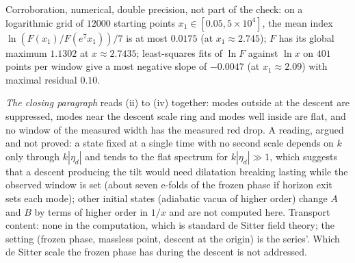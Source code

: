 Corroboration, numerical, double precision, not part of the check: on a logarithmic grid of $12000$ starting points $x_1 \in [0.05, 5 \times 10^{4}]$, the mean index $\ln(F(x_1)/F(e^{7}x_1))/7$ is at most $0.0175$ (at $x_1 \approx 2.745$); $F$ has its global maximum $1.1302$ at $x \approx 2.7435$; least-squares fits of $\ln F$ against $\ln x$ on $401$ points per window give a most negative slope of $-0.0047$ (at $x_1 \approx 2.09$) with maximal residual $0.10$. 

\emph{The closing paragraph} reads (ii) to (iv) together: modes outside at the descent are suppressed, modes near the descent scale ring and modes well inside are flat, and no window of the measured width has the measured red drop. A reading, argued and not proved: a state fixed at a single time with no second scale depends on $k$ only through $k|\eta_d|$ and tends to the flat spectrum for $k|\eta_d| \gg 1$, which suggests that a descent producing the tilt would need dilatation breaking lasting while the observed window is set (about seven e-folds of the frozen phase if horizon exit sets each mode); other initial states (adiabatic vacua of higher order) change $A$ and $B$ by terms of higher order in $1/x$ and are not computed here. Transport content: none in the computation, which is standard de Sitter field theory; the setting (frozen phase, massless point, descent at the origin) is the series'. Which de Sitter scale the frozen phase has during the descent is not addressed.
